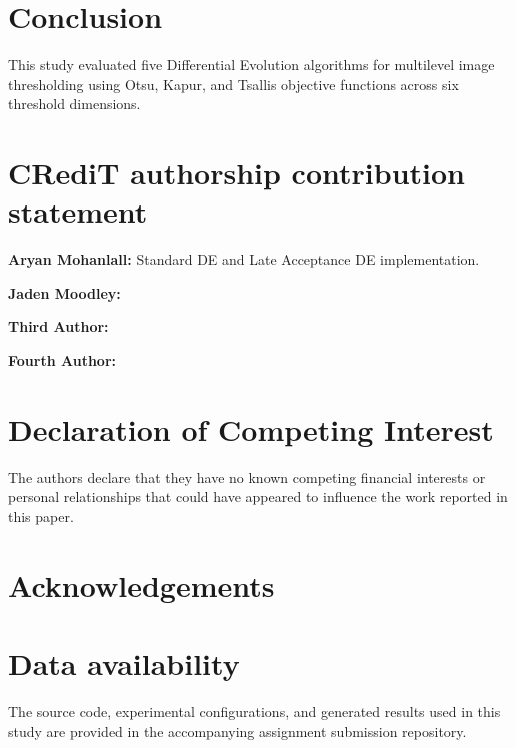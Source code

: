\documentclass[review]{elsarticle}
\begin{document}


\section{Conclusion}
\label{sec:conclusion}

This study evaluated five Differential Evolution algorithms for
multilevel image thresholding using Otsu, Kapur, and Tsallis objective
functions across six threshold dimensions.

%
%




\section*{CRediT authorship contribution statement}

\textbf{Aryan Mohanlall:}
Standard DE and Late Acceptance DE implementation.

\textbf{Jaden Moodley:}

\textbf{Third Author:}

\textbf{Fourth Author:}





\section*{Declaration of Competing Interest}

The authors declare that they have no known competing financial
interests or personal relationships that could have appeared to
influence the work reported in this paper.


\section*{Acknowledgements}



\section*{Data availability}

The source code, experimental configurations, and generated results
used in this study are provided in the accompanying assignment
submission repository.







\end{document}
